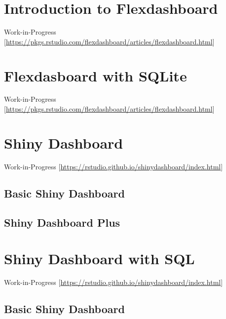 \documentclass[
]{book}
\begin{document}
\hypertarget{introduction-to-flexdashboard}{%
\chapter{Introduction to Flexdashboard}\label{introduction-to-flexdashboard}}

Work-in-Progress {[}\url{https://pkgs.rstudio.com/flexdashboard/articles/flexdashboard.html}{]}

\hypertarget{flexdasboard-with-sqlite}{%
\chapter{Flexdasboard with SQLite}\label{flexdasboard-with-sqlite}}

Work-in-Progress {[}\url{https://pkgs.rstudio.com/flexdashboard/articles/flexdashboard.html}{]}

\hypertarget{shiny-dashboard}{%
\chapter{Shiny Dashboard}\label{shiny-dashboard}}

Work-in-Progress {[}\url{https://rstudio.github.io/shinydashboard/index.html}{]}

\hypertarget{basic-shiny-dashboard}{%
\section{Basic Shiny Dashboard}\label{basic-shiny-dashboard}}

\hypertarget{shiny-dashboard-plus}{%
\section{Shiny Dashboard Plus}\label{shiny-dashboard-plus}}

\hypertarget{shiny-dashboard-with-sql}{%
\chapter{Shiny Dashboard with SQL}\label{shiny-dashboard-with-sql}}

Work-in-Progress {[}\url{https://rstudio.github.io/shinydashboard/index.html}{]}

\hypertarget{basic-shiny-dashboard-1}{%
\section{Basic Shiny Dashboard}\label{basic-shiny-dashboard-1}}
\end{document}
